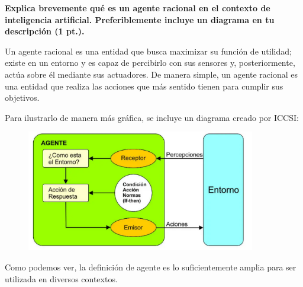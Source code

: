 \textbf{Explica brevemente qué es un agente racional en el contexto de inteligencia artificial. Preferiblemente incluye un diagrama en tu descripción (1 pt.).}\vspace{.3cm}

Un agente racional es una entidad que busca maximizar su función de utilidad; existe en un entorno y es capaz de percibirlo con sus sensores y, posteriormente, actúa sobre él mediante sus actuadores. De manera simple, un agente racional es una entidad que realiza las acciones que más sentido tienen para cumplir sus objetivos. \vspace{.3cm}

Para ilustrarlo de manera más gráfica, se incluye un diagrama creado por ICCSI: \vspace{.3cm}

\begin{figure}[h]
    \includegraphics[width=10cm]{src/Img/que-es-un-agente-software-racional-1.png}
    \centering
    \caption{\cite{iccsi_agente_racional_imagen}}
\end{figure}

Como podemos ver, la definición de agente es lo suficientemente amplia para ser utilizada en diversos contextos.

\cite{russell2020artificial}
